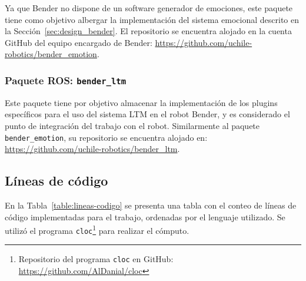 Ya que Bender no dispone de un software generador de emociones, este paquete tiene como objetivo albergar la implementación del sistema emocional descrito en la Sección~\ref{sec:design_bender}. El repositorio se encuentra alojado en la cuenta GitHub del equipo encargado de Bender: \url{https://github.com/uchile-robotics/bender\_emotion}.


\subsubsection{Paquete ROS: \texttt{bender\_ltm}}

Este paquete tiene por objetivo almacenar la implementación de los plugins específicos para el uso del sistema LTM en el robot Bender, y es considerado el punto de integración del trabajo con el robot. Similarmente al paquete \texttt{bender\_emotion}, su repositorio se encuentra alojado en: \url{https://github.com/uchile-robotics/bender\_ltm}.


\subsection{Líneas de código}

En la Tabla~\ref{table:lineas-codigo} se presenta una tabla con el conteo de líneas de código implementadas para el trabajo, ordenadas por el lenguaje utilizado. Se utilizó el programa \texttt{cloc}\footnote{Repositorio del programa \texttt{cloc} en GitHub: \url{https://github.com/AlDanial/cloc}} para realizar el cómputo.

